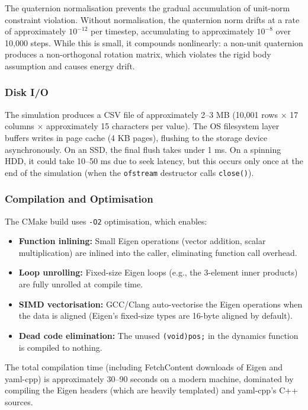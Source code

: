 \documentclass[12pt, a4paper]{article}
\begin{document}
The quaternion normalisation prevents the gradual accumulation of unit-norm constraint violation.  Without normalisation, the quaternion norm drifts at a rate of approximately $10^{-12}$ per timestep, accumulating to approximately $10^{-8}$ over 10{,}000 steps.  While this is small, it compounds nonlinearly: a non-unit quaternion produces a non-orthogonal rotation matrix, which violates the rigid body assumption and causes energy drift.

\subsubsection{Disk I/O}

The simulation produces a CSV file of approximately 2--3 MB (10{,}001 rows $\times$ 17 columns $\times$ approximately 15 characters per value).  The OS filesystem layer buffers writes in page cache (4 KB pages), flushing to the storage device asynchronously.  On an SSD, the final flush takes under 1 ms.  On a spinning HDD, it could take 10--50 ms due to seek latency, but this occurs only once at the end of the simulation (when the \texttt{ofstream} destructor calls \texttt{close()}).

\subsubsection{Compilation and Optimisation}

The CMake build uses \texttt{-O2} optimisation, which enables:
\begin{itemize}
    \item \textbf{Function inlining:}  Small Eigen operations (vector addition, scalar multiplication) are inlined into the caller, eliminating function call overhead.
    \item \textbf{Loop unrolling:}  Fixed-size Eigen loops (e.g., the 3-element inner products) are fully unrolled at compile time.
    \item \textbf{SIMD vectorisation:}  GCC/Clang auto-vectorise the Eigen operations when the data is aligned (Eigen's fixed-size types are 16-byte aligned by default).
    \item \textbf{Dead code elimination:}  The unused \texttt{(void)pos;} in the dynamics function is compiled to nothing.
\end{itemize}

The total compilation time (including FetchContent downloads of Eigen and yaml-cpp) is approximately 30--90 seconds on a modern machine, dominated by compiling the Eigen headers (which are heavily templated) and yaml-cpp's C++ sources.
\end{document}
